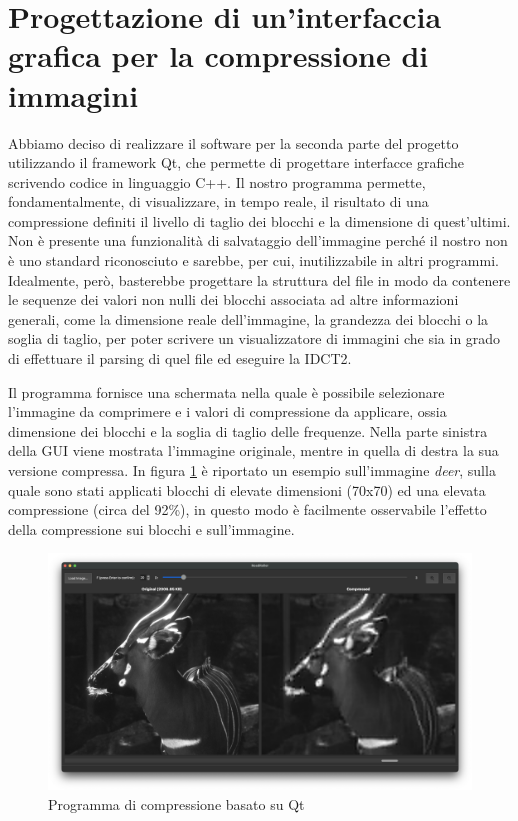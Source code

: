 \part{Progettazione di un'interfaccia grafica per la compressione di immagini}

Abbiamo deciso di realizzare il software per la seconda parte del progetto utilizzando il framework Qt\cite{qt}, che permette di progettare interfacce grafiche scrivendo codice in linguaggio C++. Il nostro programma permette, fondamentalmente, di visualizzare, in tempo reale, il risultato di una compressione definiti il livello di taglio dei blocchi e la dimensione di quest'ultimi. Non è presente una funzionalità di salvataggio dell'immagine perché il nostro non è uno standard riconosciuto e sarebbe, per cui, inutilizzabile in altri programmi.
Idealmente, però, basterebbe progettare la struttura del file in modo da contenere le sequenze dei valori non nulli dei blocchi associata ad altre informazioni generali, come la dimensione reale dell'immagine, la grandezza dei blocchi o la soglia di taglio, per poter scrivere un visualizzatore di immagini che sia in grado di effettuare il parsing di quel file ed eseguire la IDCT2.

Il programma fornisce una schermata nella quale è possibile selezionare l'immagine da comprimere e i valori di compressione da applicare, ossia dimensione dei blocchi e la soglia di taglio delle frequenze. Nella parte sinistra della GUI viene mostrata l'immagine originale, mentre in quella di destra la sua versione compressa. In figura \ref{fig:deer} è riportato un esempio sull'immagine \textit{deer}, sulla quale sono stati applicati blocchi di elevate dimensioni (70x70) ed una elevata compressione (circa del 92\%), in questo modo è facilmente osservabile l'effetto della compressione sui blocchi e sull'immagine.

\begin{figure}[h]
	\centering
	\includegraphics[width=1\linewidth]{figures/qt_deer}
	\caption{Programma di compressione basato su Qt}
	\label{fig:deer}
\end{figure}

